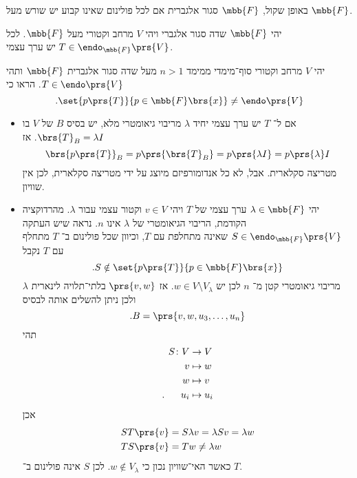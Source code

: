 \documentclass[a4paper,10pt,oneside,openany]{article}
\begin{document}
\begin{remark}
באופן שקול,
$\mbb{F}$
סגור אלגברית אם לכל פולינום שאינו קבוע יש שורש מעל
$\mbb{F}$.
\end{remark}

\begin{fact}
יהי
$\mbb{F}$
שדה סגור אלגברי ויהי
$V$
מרחב וקטורי מעל
$\mbb{F}$.
לכל
$T \in \endo_{\mbb{F}}\prs{V}$
יש ערך עצמי.
\end{fact}

\begin{exercise}
יהי
$V$
מרחב וקטורי סוף־מימדי ממימד
$n > 1$
מעל שדה סגור אלגברית
$\mbb{F}$
ותהי
$T \in \endo\prs{V}$.
הראו כי
\[\text{.} \set{p\prs{T}}{p \in \mbb{F}\brs{x}} \neq \endo\prs{V}\]
\end{exercise}

\begin{solution}
\begin{itemize}
\item אם ל־%
$T$
יש ערך עצמי יחיד
$\lambda$
מריבוי גיאומטרי מלא, יש בסיס
$B$
של
$V$
בו
$\brs{T}_B = \lambda I$.
אז
\[\brs{p\prs{T}}_B = p\prs{\brs{T}_B} = p\prs{\lambda I} = p\prs{\lambda} I\]
מטריצה סקלארית.
אבל, לא כל אנדומורפיזם מיוצג על ידי מטריצה סקלארית, לכן אין שוויון.

\item
יהי
$\lambda \in \mbb{F}$
ערך עצמי של
$T$
ויהי
$v \in V$
וקטור עצמי עבור
$\lambda$.
מהרדוקציה הקודמת, הריבוי הגיאומטרי של
$\lambda$
אינו
$n$.
נראה שיש העתקה
$S \in \endo_{\mbb{F}}\prs{V}$
שאינה מתחלפת עם
$T$,
וכיוון שכל פולינום ב־%
$T$
מתחלף עם
$T$
נקבל
\[\text{.} S \notin \set{p\prs{T}}{p \in \mbb{F}\brs{x}}\]
$\lambda$
מריבוי גיאומטרי קטן מ־%
$n$
לכן יש
$w \in V \setminus V_\lambda$.
אז
$\prs{v, w}$
בלתי־תלויה לינארית ולכן ניתן להשלים אותה לבסיס
\[\text{.} B = \prs{v,w, u_3, \ldots, u_n}\]
תהי
\begin{align*}
S \colon V &\to V \\
v &\mapsto w \\
w &\mapsto v \\
\text{.} \hphantom{lala} u_i &\mapsto u_i
\end{align*}
אכן
\begin{align*}
ST\prs{v} &= S\lambda v = \lambda Sv = \lambda w \\
TS\prs{v} &= Tw \neq \lambda w
\end{align*}
כאשר האי־שוויון נכון כי
$w \notin V_\lambda$.
לכן
$S$
אינה פולינום ב־%
$T$.
\end{itemize}
\end{solution}
\end{document}
